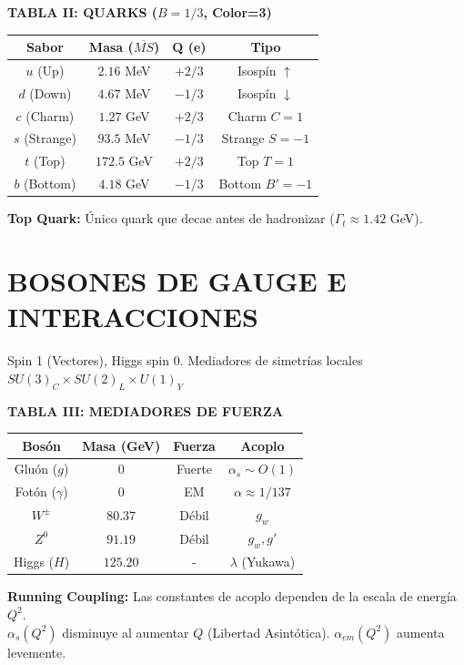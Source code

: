     \begin{center}
        \textbf{TABLA II: QUARKS ($B=1/3$, Color=3)}
        \begin{tabular}{|c|c|c|c|}
            \hline
            \textbf{Sabor} & \textbf{Masa ($\overline{MS}$)} & \textbf{Q (e)} & \textbf{Tipo}       \\ \hline
            $u$ (Up)       & $2.16$ MeV                      & $+2/3$         & Isospín $\uparrow$   \\
            $d$ (Down)     & $4.67$ MeV                      & $-1/3$         & Isospín $\downarrow$ \\ \hline
            $c$ (Charm)    & $1.27$ GeV                      & $+2/3$         & Charm $C=1$          \\
            $s$ (Strange)  & $93.5$ MeV                      & $-1/3$         & Strange $S=-1$       \\ \hline
            $t$ (Top)      & $172.5$ GeV                     & $+2/3$         & Top $T=1$            \\
            $b$ (Bottom)   & $4.18$ GeV                      & $-1/3$         & Bottom $B'=-1$       \\ \hline
        \end{tabular}
    \end{center}
    \textbf{Top Quark:} Único quark que decae antes de hadronizar ($\Gamma_t \approx 1.42$ GeV).

    \section{BOSONES DE GAUGE E INTERACCIONES}
    Spin 1 (Vectores), Higgs spin 0. Mediadores de simetrías locales $SU(3)_C\!\times\! SU(2)_L\! \times\! U(1)_Y$

    \begin{center}
        \textbf{TABLA III: MEDIADORES DE FUERZA}
        \begin{tabular}{|c|c|c|c|}
            \hline
            \textbf{Bosón}   & \textbf{Masa (GeV)} & \textbf{Fuerza} & \textbf{Acoplo}        \\ \hline
            Gluón ($g$)      & $0$       & Fuerte          & $\alpha_s \sim O(1)$   \\
            Fotón ($\gamma$) & $0$       & EM              & $\alpha \approx 1/137$ \\
            $W^\pm$          & $80.37$    & Débil           & $g_w$                  \\
            $Z^0$            & $91.19$   & Débil           & $g_w, g'$              \\
            Higgs ($H$)      & $125.20$   & -               & $\lambda$ (Yukawa)     \\ \hline
        \end{tabular}
    \end{center}
    \textbf{Running Coupling:} Las constantes de acoplo dependen de la escala de energía $Q^2$.
    \\ $\alpha_s(Q^2)$ disminuye al aumentar $Q$ (Libertad Asintótica). $\alpha_{em}(Q^2)$ aumenta levemente.

